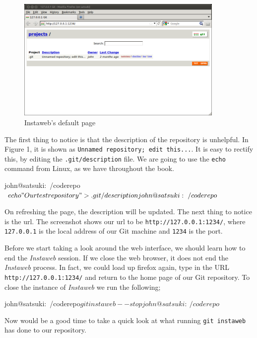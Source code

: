 \begin{figure}[hbt]
\centering
\includegraphics[width=10cm]{images/f-af7-d1.png}
\caption{Instaweb's default page}
\end{figure}

The first thing to notice is that the description of the repository is unhelpful.
In Figure 1, it is shown as \texttt{Unnamed repository; edit this...}.
It is easy to rectify this, by editing the \texttt{.git/description} file.
We are going to use the \texttt{echo} command from Linux, as we have throughout the book.

\begin{code}
john@satsuki:~/coderepo$ echo "Our test repository" > .git/description 
john@satsuki:~/coderepo$ 
\end{code}

On refreshing the page, the description will be updated.
The next thing to notice is the url.
The screenshot shows our url to be \texttt{http://127.0.0.1:1234/}, where \texttt{127.0.0.1} is the local address of our Git machine and \texttt{1234} is the port.

Before we start taking a look around the web interface, we should learn how to end the \emph{Instaweb} session.
If we close the web browser, it does not end the \emph{Instaweb} process.
In fact, we could load up firefox again, type in the URL \texttt{http://127.0.0.1:1234/} and return to the home page of our Git repository.
To close the instance of \emph{Instaweb} we run the following;

\begin{code}
john@satsuki:~/coderepo$ git instaweb --stop
john@satsuki:~/coderepo$ 
\end{code}

Now would be a good time to take a quick look at what running \texttt{git instaweb} has done to our repository.
